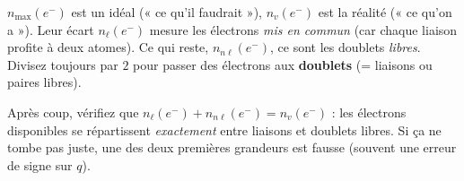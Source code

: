 \documentclass[11pt,a4paper]{article}
\newcommand{\nmax}{n_{\max}(e^-)}
\newcommand{\nv}{n_{v}(e^-)}
\newcommand{\nl}{n_{\ell}(e^-)}
\newcommand{\nnl}{n_{n\ell}(e^-)}
\begin{document}
\begin{attnbox}
$\nmax$ est un idéal (« ce qu'il faudrait »), $\nv$ est la réalité (« ce qu'on a »). Leur écart
$\nl$ mesure les électrons \emph{mis en commun} (car chaque liaison profite à deux atomes). Ce qui
reste, $\nnl$, ce sont les doublets \emph{libres}. Divisez toujours par $2$ pour passer des
électrons aux \textbf{doublets} (= liaisons ou paires libres).
\end{attnbox}

\begin{astucebox}
Après coup, vérifiez que $\nl + \nnl = \nv$ : les électrons disponibles se répartissent
\emph{exactement} entre liaisons et doublets libres. Si ça ne tombe pas juste, une des deux
premières grandeurs est fausse (souvent une erreur de signe sur $q$).
\end{astucebox}
\end{document}
